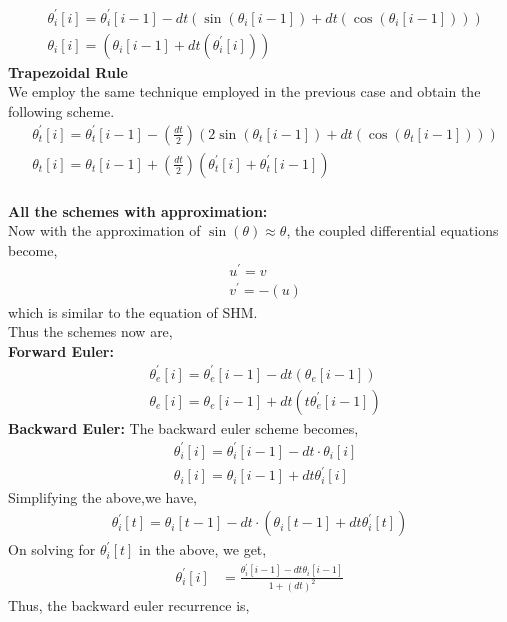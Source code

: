 \documentclass[letterpaper]{exam}
\begin{document}
\begin{questions}
\begin{solution}
\begin{align}
    &\theta^{'}_i[i] = \theta^{'}_i[i-1] - dt(\sin{(\theta_i[i-1])}+dt(\cos{(\theta_i[i-1])}))\\
    &\theta_i[i]      = (\theta_i[i-1] + dt(\theta^{'}_i[i]))
\end{align}
\textbf{Trapezoidal Rule}\\
We employ the same technique employed in the previous case and obtain the following scheme.
\begin{align}
    &\theta^{'}_t[i] = \theta^{'}_t[i-1] - (\frac{dt}{2})(2\sin{(\theta_t[i-1])}+dt(\cos{(\theta_t[i-1])}))\\
    &\theta_t[i] = \theta_t[i-1] + (\frac{dt}{2})(\theta^{'}_t[i]+\theta^{'}_t[i-1])
\end{align}
\\
\textbf{All the schemes with approximation:}\\
Now with the approximation of $\sin{(\theta)} \approx \theta$, the coupled differential equations become,
\begin{align}
    &u^{'} = v\\
    &v^{'} = -(u)
\end{align}
which is similar to the equation of SHM.\\
Thus the schemes now are,\\
\textbf{Forward Euler:}
\begin{align}
    &\theta^{'}_e[i] = \theta^{'}_e[i-1] - dt(\theta_e[i-1])\\
    &\theta_e[i]      = \theta_e[i-1] + dt(t\theta^{'}_e[i-1])
\end{align}
\textbf{Backward Euler:}
The backward euler scheme becomes,\\
\begin{align*}
    &\theta^{'}_i[i] = \theta^{'}_i[i-1] - dt\cdot\theta_i[i]\\
    &\theta_i[i] = \theta_i[i-1] + dt\theta^{'}_i[i]
\end{align*}
Simplifying the above,we have,
\begin{align*}
    \theta^{'}_i[t] = \theta_i[t-1] - dt\cdot\left(\theta_i[t-1] + dt\theta^{'}_i[t]\right)
\end{align*}
On solving for $\theta^{'}_i[t]$ in the above, we get,
\begin{align}
    \theta^{'}_i[i] &= \frac{\theta^{'}_i[i-1] - dt\theta_i[i-1]}{1+(dt)^{2}}
\end{align}
Thus, the backward euler recurrence is,
\begin{align}

\end{align}
\end{solution}
\end{questions}
\end{document}
